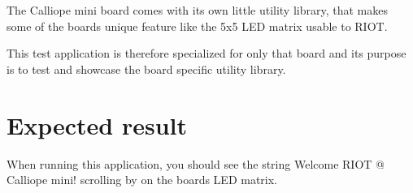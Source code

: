 The Calliope mini board comes with its own little utility library, that makes some of the boards unique feature like the 5x5 L\+ED matrix usable to R\+I\+OT.

This test application is therefore specialized for only that board and its purpose is to test and showcase the board specific utility library.

\section*{Expected result }

When running this application, you should see the string {\ttfamily Welcome R\+I\+OT @ Calliope mini!} scrolling by on the boards L\+ED matrix. 
